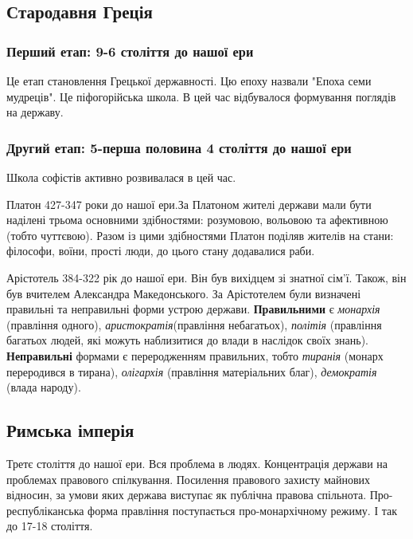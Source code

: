 \subsection{Стародавня Греція}
\subsubsection{Перший етап: 9-6 століття до нашої ери}
Це етап становлення Грецької державності. Цю епоху назвали "Епоха семи мудреців". Це піфогорійська школа. В цей час відбувалося формування поглядів на державу.
\subsubsection{Другий етап: 5-перша половина 4 століття до нашої ери}
Школа софістів активно розвивалася в цей час.

Платон 427-347 роки до нашої ери.За Платоном жителі держави мали бути наділені трьома основними здібностями: розумовою, вольовою та афективною (тобто чуттєвою). Разом із цими здібностями Платон поділяв жителів на стани: філософи, воїни, прості люди, до цього стану додавалися раби. 

Арістотель 384-322 рік до нашої ери. Він був вихідцем зі знатної сім’ї. Також, він був вчителем Александра Македонського. За Арістотелем були визначені правильні та неправильні форми устрою держави. \textbf{Правильними} є \textit{монархія} (правління одного), \textit{аристократія}(правління небагатьох), \textit{політія} (правління багатьох людей, які можуть наблизитися до влади в наслідок своїх знань). \textbf{Неправильні} формами є переродженням правильних, тобто \textit{тиранія} (монарх переродився в тирана), \textit{олігархія} (правління матеріальних благ), \textit{демократія} (влада народу). 
\subsection{Римська імперія}
Третє століття до нашої ери. Вся проблема в людях. Концентрація держави на проблемах правового спілкування. Посилення правового захисту майнових відносин, за умови яких держава виступає як публічна правова спільнота. Про-республіканська форма правління  поступається про-монархічному режиму. І так до 17-18 століття.
